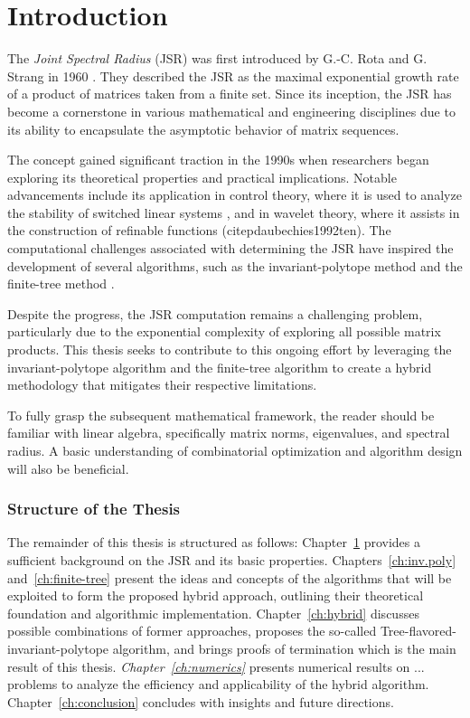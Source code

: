 
\chapter{Introduction}
\label{ch:introduction} %

The \textit{Joint Spectral Radius} (JSR) was first introduced by G.-C. Rota and G. Strang in 1960 \citep{rotaNoteJointSpectral1960}. They described the JSR as the maximal exponential growth rate of a product of matrices taken from a finite set. Since its inception, the JSR has become a cornerstone in various mathematical and engineering disciplines due to its ability to encapsulate the asymptotic behavior of matrix sequences. 

The concept gained significant traction in the 1990s when researchers began exploring its theoretical properties and practical implications. Notable advancements include its application in control theory, where it is used to analyze the stability of switched linear systems \citep{blondelSurveyComputationalComplexity2000}, and in wavelet theory, where it assists in the construction of refinable functions (citep{daubechies1992ten}). The computational challenges associated with determining the JSR have inspired the development of several algorithms, such as the invariant-polytope method \citep{guglielmiExactComputationJoint2013} and the finite-tree method \citep{jungersJointSpectralRadius2009}.

Despite the progress, the JSR computation remains a challenging problem, particularly due to the exponential complexity of exploring all possible matrix products. This thesis seeks to contribute to this ongoing effort by leveraging the invariant-polytope algorithm and the finite-tree algorithm to create a hybrid methodology that mitigates their respective limitations.

To fully grasp the subsequent mathematical framework, the reader should be familiar with linear algebra, specifically matrix norms, eigenvalues, and spectral radius. A basic understanding of combinatorial optimization and algorithm design will also be beneficial.

\subsection*{Structure of the Thesis}
The remainder of this thesis is structured as follows: Chapter~\ref{ch:introduction} provides a sufficient background on the JSR and its basic properties. Chapters~\ref{ch:inv.poly} and~\ref{ch:finite-tree} present the ideas and concepts of the algorithms that will be exploited to form the proposed hybrid approach, outlining their theoretical foundation and algorithmic implementation. Chapter~\ref{ch:hybrid} discusses possible combinations of former approaches, proposes the so-called Tree-flavored-invariant-polytope algorithm, and brings proofs of termination which is the main result of this thesis. \emph{Chapter~\ref{ch:numerics}} presents numerical results on ... problems to analyze the efficiency and applicability of the hybrid algorithm. Chapter~\ref{ch:conclusion} concludes with insights and future directions.

